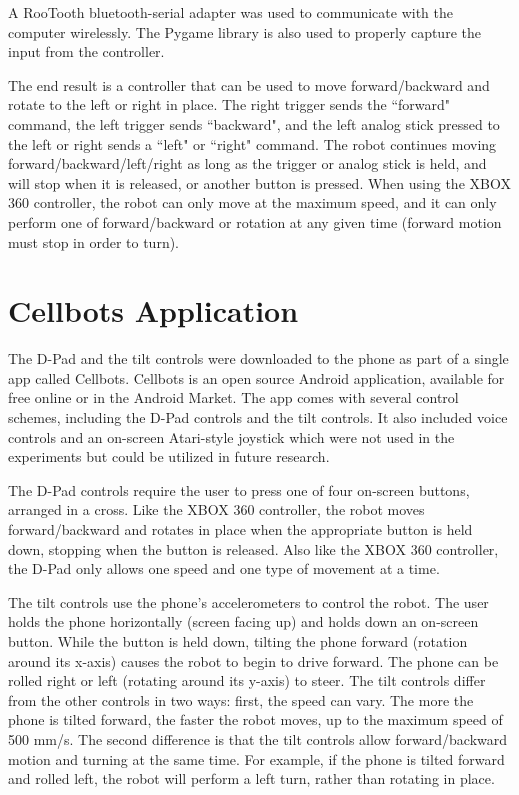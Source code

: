 \documentclass[12pt,a4paper]{report}
\begin{document}
A RooTooth bluetooth-serial adapter was used to communicate with the computer wirelessly. The Pygame library is also used to properly capture the input from the controller. 

The end result is a controller that can be used to move forward/backward and rotate to the left or right in place. The right trigger sends the ``forward" command, the left trigger sends ``backward", and the left analog stick pressed to the left or right sends a ``left" or ``right" command. The robot continues moving forward/backward/left/right as long as the trigger or analog stick is held, and will stop when it is released, or another button is pressed. When using the XBOX 360 controller, the robot can only move at the maximum speed, and it can only perform one of forward/backward or rotation at any given time (forward motion must stop in order to turn).

\section{Cellbots Application}
The D-Pad and the tilt controls were downloaded to the phone as part of a single app called Cellbots. Cellbots is an open source Android application, available for free online or in the Android Market. The app comes with several control schemes, including the D-Pad controls and the tilt controls. It also included voice controls and an on-screen Atari-style joystick which were not used in the experiments but could be utilized in future research.

The D-Pad controls require the user to press one of four on-screen buttons, arranged in a cross. Like the XBOX 360 controller, the robot moves forward/backward and rotates in place when the appropriate button is held down, stopping when the button is released. Also like the XBOX 360 controller, the D-Pad only allows one speed and one type of movement at a time.

The tilt controls use the phone's accelerometers to control the robot. The user holds the phone horizontally (screen facing up) and holds down an on-screen button. While the button is held down, tilting the phone forward (rotation around its x-axis) causes the robot to begin to drive forward. The phone can be rolled right or left (rotating around its y-axis) to steer. 
The tilt controls differ from the other controls in two ways: first, the speed can vary. The more the phone is tilted forward, the faster the robot moves, up to the maximum speed of 500 mm/s.  The second difference is that the tilt controls allow forward/backward motion and turning at the same time. For example, if the phone is tilted forward and rolled left, the robot will perform a left turn, rather than rotating in place.
\end{document}
